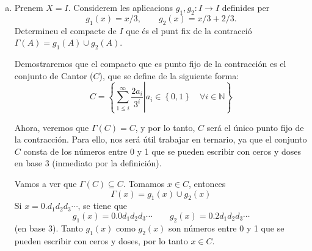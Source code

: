 \documentclass[12pt]{article}
\newcommand{\n}{\mathbb{N}}
\newcommand\setb[1]{\left\{#1\right\}}
\theoremstyle{break}
\begin{document}
{\begin{enumerate}[a)]
	Ahora, generalizamos el resultado por inducción. Acabmos de
	demostrar el paso base, suponemos ahora que se cumple para
	$n$, es decir,
	\[
		h(A_1 \cup \cdots \cup A_n, C_1 \cup \cdots C_n) \leq \max
		\setb{ h\left( A_1, C_1 \right), \dots, h\left( A_n, C_n
		\right)}
	\]
	Ahora
	\[
		\begin{aligned} 
			h\left( A_1 \cup \cdots \cup A_n \cup B, C_1 \cup \cdots
			\cup C_n \cup D \right) &\leq \max \setb{ h\left( A_1
					\cup \cdots \cup A_n, C_1 \cup \cdots \cup C_n
			\right), h(B, D)} \\ &\leq \max \setb{ h\left( A_1,
				C_1 \right), \dots, h\left( A_n, C_n \right), h(B,
			D)}
		\end{aligned}
	\]
	Por lo tanto el resultado se cumple para $n+1$ y el queda
	probado.

	Ahora, consideramos la $\Gamma$ del enunciado, entonces
	\[
		\begin{aligned}
			h\left( \Gamma(A), \Gamma(B) \right) =
			h\left( \bigcup_{1 \leq i \leq n} G_i(A), \bigcup_{1
			\leq i \leq n} G_i(B) \right)
			&\leq \max_{1 \leq i \leq n} \setb{ h\left( G_i(A), G_i(B) \right)} \\
			&\leq \max_{1 \leq i \leq n} \setb{ c_i h(A, B) } \\
			&\leq \max_{1 \leq i \leq n} \setb{ c_i } h(A, B)
		\end{aligned}
	\]
	Por lo tanto, $\Gamma$ es una contracción de constante $c = \max\limits_{1 \leq i \leq n} \setb{c_i}$.

\item Prenem $X = I$. Considerem les aplicacions
	$g_1, g_2 \colon I \to I$ definides per
	\[
		g_1(x) = x/3, \qquad g_2(x) = x/3 + 2/3.
	\]
	Determineu el compacte de $I$ que és el punt fix de la
	contracció $\Gamma(A) = g_1(A) \cup g_2(A)$.
	
	\quad

	Demostraremos que el compacto que es punto fijo de la
	contracción es el conjunto de Cantor ($C$), que se define de la
	siguiente forma:
	\[
		C = \setb{\left. \sum^\infty_{1 \leq i} \frac{2a_i}{3^i} \right\vert a_i \in \setb{0, 1} \quad \forall i \in \n}
	\]

	Ahora, veremos que $\Gamma(C) = C$, y por lo tanto, $C$ será el único punto fijo de la contracción. Para ello, nos será útil
	trabajar en ternario, ya que el conjunto $C$ consta de los números entre 0 y 1 que se pueden escribir con ceros y doses en base 3 
	(inmediato por la definición).

	Vamos a ver que $\Gamma(C) \subseteq C$. Tomamos $x \in C$, entonces
	\[
		\Gamma(x) = g_1(x) \cup g_2(x)
	\]
	Si $x = 0.d_1d_2d_3\cdots$, se tiene que
	\[
		g_1(x) = 0.0d_1d_2d_3\cdots \qquad g_2(x) = 0.2d_1d_2d_3\cdots
	\]
	(en base 3). Tanto $g_1(x)$ como $g_2(x)$ son números entre 0 y 1 que se pueden escribir con ceros y doses, por lo tanto $x \in C$.


\end{enumerate}}
\end{document}
